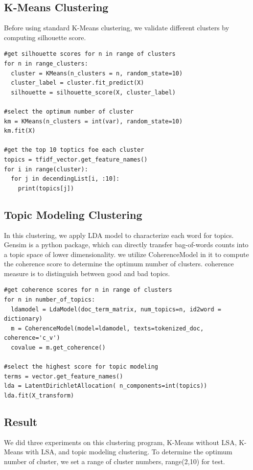 \documentclass[12pt]{article}
\begin{document}
\subsection{K-Means Clustering}
Before using standard K-Means clustering, we validate different clusters by computing silhouette score.
\begin{lstlisting}[captionpos=b, caption=K-Means Clustering, label=listing:sparql_getallindividuals,
basicstyle=\ttfamily]
#get silhouette scores for n in range of clusters
for n in range_clusters:
  cluster = KMeans(n_clusters = n, random_state=10)
  cluster_label = cluster.fit_predict(X)
  silhouette = silhouette_score(X, cluster_label)
  
#select the optimum number of cluster
km = KMeans(n_clusters = int(var), random_state=10)
km.fit(X)

#get the top 10 toptics foe each cluster
topics = tfidf_vector.get_feature_names()
for i in range(cluster):
  for j in decendingList[i, :10]:
    print(topics[j])
\end{lstlisting}

\subsection{Topic Modeling Clustering}
In this clustering, we apply LDA model to characterize each word for topics. Gensim is a python package, which can directly transfer bag-of-words counts into a topic space of lower dimensionality. we utilize CoherenceModel in it to compute the coherence score to determine the optimum number of clusters. coherence measure is to distinguish between good and bad topics.
\begin{lstlisting}[captionpos=b, caption=Topic Modeling Clustering, label=listing:sparql_getallindividuals, basicstyle=\ttfamily]
#get coherence scores for n in range of clusters
for n in number_of_topics:
  ldamodel = LdaModel(doc_term_matrix, num_topics=n, id2word = dictionary) 
  m = CoherenceModel(model=ldamodel, texts=tokenized_doc, coherence='c_v')
  covalue = m.get_coherence()
  
#select the highest score for topic modeling
terms = vector.get_feature_names()
lda = LatentDirichletAllocation( n_components=int(topics))
lda.fit(X_transform)
\end{lstlisting}

\subsection{Result}
We did three experiments on this clustering program, K-Means without LSA, K-Means with LSA, and topic modeling clustering. To determine the optimum number of cluster, we set a range of cluster numbers, range(2,10) for test.
\end{document}
